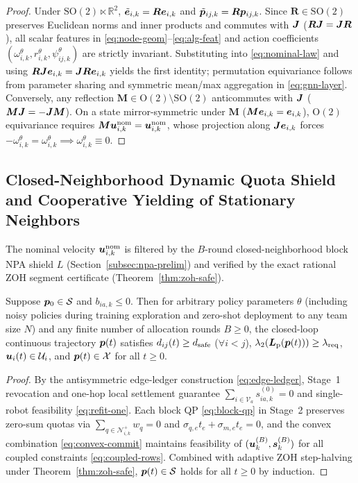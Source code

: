 \begin{proof}
Under $\mathrm{SO}(2)\ltimes\mathbb R^2$, $\tilde{\boldsymbol{e}}_{i,k}=\boldsymbol R\boldsymbol{e}_{i,k}$ and $\tilde{\boldsymbol{p}}_{ij,k}=\boldsymbol R\boldsymbol{p}_{ij,k}$. Since $\boldsymbol R\in\mathrm{SO}(2)$ preserves Euclidean norms and inner products and commutes with $\boldsymbol{J}$ ($\boldsymbol R\boldsymbol{J}=\boldsymbol{J}\boldsymbol R$), all scalar features in \eqref{eq:node-geom}--\eqref{eq:alg-feat} and action coefficients $(\omega_{i,k}^\theta,r_{i,k}^\theta,\psi_{ij,k}^\theta)$ are strictly invariant. Substituting into \eqref{eq:nominal-law} and using $\boldsymbol R\boldsymbol{J}\boldsymbol{e}_{i,k}=\boldsymbol{J}\boldsymbol R\boldsymbol{e}_{i,k}$ yields the first identity; permutation equivariance follows from parameter sharing and symmetric mean/max aggregation in \eqref{eq:gnn-layer}. Conversely, any reflection $\boldsymbol M\in\mathrm{O}(2)\setminus\mathrm{SO}(2)$ anticommutes with $\boldsymbol{J}$ ($\boldsymbol M\boldsymbol{J}=-\boldsymbol{J}\boldsymbol M$). On a state mirror-symmetric under $\boldsymbol M$ ($\boldsymbol M\boldsymbol{e}_{i,k}=\boldsymbol{e}_{i,k}$), $\mathrm{O}(2)$ equivariance requires $\boldsymbol M\boldsymbol{u}_{i,k}^{\mathrm{nom}}=\boldsymbol{u}_{i,k}^{\mathrm{nom}}$, whose projection along $\boldsymbol{J}\boldsymbol{e}_{i,k}$ forces $-\omega_{i,k}^\theta=\omega_{i,k}^\theta\implies\omega_{i,k}^\theta\equiv 0$.
\end{proof}

\subsection{Closed-Neighborhood Dynamic Quota Shield and Cooperative Yielding of Stationary Neighbors}\label{subsec:npa-yield}
The nominal velocity $\boldsymbol{u}_{i,k}^{\mathrm{nom}}$ is filtered by the $B$-round closed-neighborhood block NPA shield $L$ (Section~\ref{subsec:npa-prelim}) and verified by the exact rational ZOH segment certificate (Theorem~\ref{thm:zoh-safe}).

\begin{proposition}\label{prop:safety}
Suppose $\boldsymbol{p}_0\in\mathcal S$ and $b_{ia,k}\le 0$. Then for arbitrary policy parameters $\theta$ (including noisy policies during training exploration and zero-shot deployment to any team size $N$) and any finite number of allocation rounds $B\ge 0$, the closed-loop continuous trajectory $\boldsymbol{p}(t)$ satisfies $d_{ij}(t)\ge d_{\mathrm{safe}}$ ($\forall i<j$), $\lambda_2(\boldsymbol{L}_{\mathrm{p}}(\boldsymbol{p}(t)))\ge\lambda_{\mathrm{req}}$, $\boldsymbol{u}_i(t)\in\mathcal U_i$, and $\boldsymbol{p}(t)\in\mathcal X$ for all $t\ge 0$.
\end{proposition}
\begin{proof}
By the antisymmetric edge-ledger construction \eqref{eq:edge-ledger}, Stage~1 revocation and one-hop local settlement guarantee $\sum_{i\in\mathcal V_a}s_{ia,k}^{(0)}=0$ and single-robot feasibility \eqref{eq:refit-one}. Each block QP \eqref{eq:block-qp} in Stage~2 preserves zero-sum quotas via $\sum_{q\in\mathcal N_{i,k}^+}w_q=0$ and $\sigma_{q,e}t_e+\sigma_{m,e}t_e=0$, and the convex combination \eqref{eq:convex-commit} maintains feasibility of $(\boldsymbol{u}_k^{(B)},\boldsymbol s_k^{(B)})$ for all coupled constraints \eqref{eq:coupled-rows}. Combined with adaptive ZOH step-halving under Theorem~\ref{thm:zoh-safe}, $\boldsymbol{p}(t)\in\mathcal S$ holds for all $t\ge 0$ by induction.
\end{proof}

